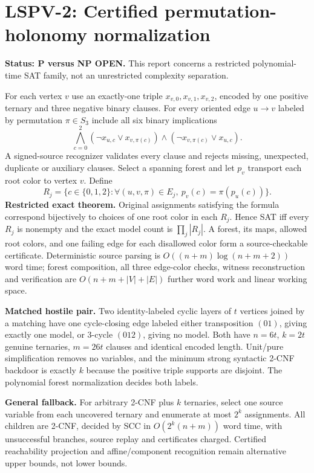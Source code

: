 \documentclass{article}
\begin{document}
\section*{LSPV-2: Certified permutation-holonomy normalization}
\textbf{Status: P versus NP OPEN.} This report concerns a restricted polynomial-time SAT family, not an unrestricted complexity separation.

For each vertex $v$ use an exactly-one triple $x_{v,0},x_{v,1},x_{v,2}$, encoded by one positive ternary and three negative binary clauses. For every oriented edge $u\to v$ labeled by permutation $\pi\in S_3$ include all six binary implications
\[
\bigwedge_{c=0}^2(\neg x_{u,c}\vee x_{v,\pi(c)})
\wedge(\neg x_{v,\pi(c)}\vee x_{u,c}).
\]
A signed-source recognizer validates every clause and rejects missing, unexpected, duplicate or auxiliary clauses. Select a spanning forest and let $p_v$ transport each root color to vertex $v$. Define
\[
R_j=\{c\in\{0,1,2\}:\forall(u,v,\pi)\in E_j,\ 
p_v(c)=\pi(p_u(c))\}.
\]
\textbf{Restricted exact theorem.} Original assignments satisfying the formula correspond bijectively to choices of one root color in each $R_j$. Hence SAT iff every $R_j$ is nonempty and the exact model count is $\prod_j|R_j|$. A forest, its maps, allowed root colors, and one failing edge for each disallowed color form a source-checkable certificate. Deterministic source parsing is $O((n+m)\log(n+m+2))$ word time; forest composition, all three edge-color checks, witness reconstruction and verification are $O(n+m+|V|+|E|)$ further word work and linear working space.

\textbf{Matched hostile pair.} Two identity-labeled cyclic layers of $t$ vertices joined by a matching have one cycle-closing edge labeled either transposition $(01)$, giving exactly one model, or 3-cycle $(012)$, giving no model. Both have $n=6t$, $k=2t$ genuine ternaries, $m=26t$ clauses and identical encoded length. Unit/pure simplification removes no variables, and the minimum strong syntactic 2-CNF backdoor is exactly $k$ because the positive triple supports are disjoint. The polynomial forest normalization decides both labels.

\textbf{General fallback.} For arbitrary 2-CNF plus $k$ ternaries, select one source variable from each uncovered ternary and enumerate at most $2^k$ assignments. All children are 2-CNF, decided by SCC in $O(2^k(n+m))$ word time, with unsuccessful branches, source replay and certificates charged. Certified reachability projection and affine/component recognition remain alternative upper bounds, not lower bounds.
\end{document}
